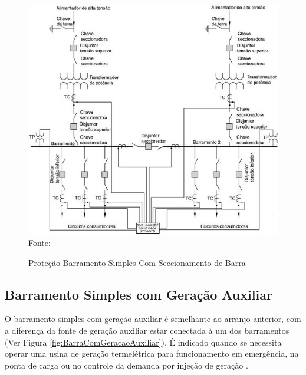 \begin{figure}[!htb] 
    \centering
    \caption{Proteção Barramento Simples Com Seccionamento de Barra}
    \includegraphics[scale = 0.7]{figuras/BarraSeccionada.png}
    \\ Fonte: \cite{mamede2000protecao}
    \label{fig:BarraSeccionada}
\end{figure}


\newpage

\subsection{Barramento Simples com Geração Auxiliar}

O barramento simples com geração auxiliar é semelhante ao arranjo anterior, com a diferença da fonte de geração auxiliar estar conectada à um dos barramentos (Ver Figura \ref{fig:BarraComGeracaoAuxiliar}). É indicado quando se necessita operar uma usina de geração termelétrica para funcionamento em emergência, na ponta de carga ou no controle da demanda por injeção de geração \cite{mamede2000protecao}.

